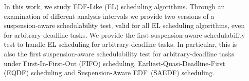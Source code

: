 \documentclass[conference]{IEEEtran}
\theoremstyle{definition}
\theoremstyle{remark}
\begin{document}
In this work, we study EDF-Like (EL) scheduling algorithms.
Through an examination of different analysis intervals we provide two versions of a suspension-aware schedulability test, valid for all EL scheduling algorithms, even for arbitrary-deadline tasks.
We provide the first suspension-aware schedulability test to handle EL scheduling for arbitrary-deadline tasks.
In particular, this is also the first suspension-aware schedulability test for arbitrary-deadline tasks under First-In-First-Out (FIFO) scheduling, Earliest-Quasi-Deadline-First (EQDF) scheduling and Suspension-Aware EDF~(SAEDF) scheduling.




\end{document}
